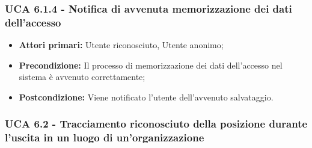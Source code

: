 \subsubsection{UCA 6.1.4 - Notifica di avvenuta memorizzazione dei dati dell'accesso}%
\begin{itemize}
	\item \textbf{Attori primari:} Utente riconosciuto, Utente anonimo;
	\item \textbf{Precondizione:} Il processo di memorizzazione dei dati dell'accesso nel sistema è avvenuto correttamente;
	\item \textbf{Postcondizione:} Viene notificato l'utente dell'avvenuto salvataggio.
\end{itemize}

\subsubsection{UCA 6.2 - Tracciamento riconosciuto della posizione durante l'uscita in un luogo di un'organizzazione}%
